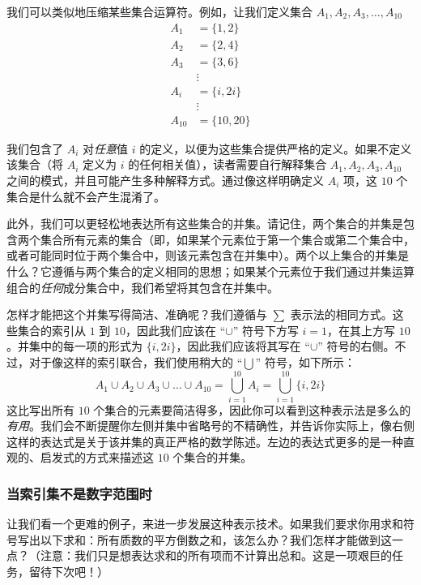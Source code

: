 \begin{example}\label{ex:example3.6.8}
    我们可以类似地压缩某些集合运算符。例如，让我们定义集合 $A_1, A_2, A_3, \dots, A_{10}$
    \begin{align*}
        A_1 &= \{1, 2\} \\
        A_2 &= \{2, 4\} \\
        A_3 &= \{3, 6\} \\
        &\vdots \\
        A_i &= \{i, 2i\} \\
        &\vdots \\
        A_{10} &= \{10, 20\}
    \end{align*}

    我们包含了 $A_i$ 对\emph{任意}值 $i$ 的定义，以便为这些集合提供严格的定义。如果不定义该集合（将 $A_i$ 定义为 $i$ 的任何相关值），读者需要自行解释集合 $A_1,A_2,A_3,A_{10}$ 之间的模式，并且可能产生多种解释方式。通过像这样明确定义 $A_i$ 项，这 $10$ 个集合是什么就不会产生混淆了。

    此外，我们可以更轻松地表达所有这些集合的并集。请记住，两个集合的并集是包含两个集合所有元素的集合（即，如果某个元素位于第一个集合或第二个集合中，或者可能同时位于两个集合中，则该元素包含在并集中）。两个以上集合的并集是什么？它遵循与两个集合的定义相同的思想；如果某个元素位于我们通过并集运算组合的\emph{任何}成分集合中，我们希望将其包含在并集中。

    怎样才能把这个并集写得简洁、准确呢？我们遵循与 $\sum$ 表示法的相同方式。这些集合的索引从 $1$ 到 $10$，因此我们应该在 ``$\cup$'' 符号下方写 $i = 1$，在其上方写 $10$。并集中的每一项的形式为 $\{i, 2i\}$，因此我们应该将其写在 ``$\cup$'' 符号的右侧。不过，对于像这样的索引联合，我们使用稍大的 ``$\bigcup$'' 符号，如下所示：
    \[A_1 \cup A_2 \cup A_3 \cup \dots \cup A_{10} = \bigcup_{i=1}^{10}A_i=\bigcup_{i=1}^{10}\{i, 2i\}\]
    这比写出所有 $10$ 个集合的元素要简洁得多，因此你可以看到这种表示法是多么的\emph{有用}。我们会不断提醒你左侧并集中省略号的不精确性，并告诉你实际上，像右侧这样的表达式是关于该并集的真正严格的数学陈述。左边的表达式更多的是一种直观的、启发式的方式来描述这 $10$ 个集合的并集。
\end{example}

\subsubsection*{当索引集不是数字范围时}

让我们看一个更难的例子，来进一步发展这种表示技术。如果我们要求你用求和符号写出以下求和：所有质数的平方倒数之和，该怎么办？我们怎样才能做到这一点？（注意：我们只是想表达求和的所有项而不计算出总和。这是一项艰巨的任务，留待下次吧！）

